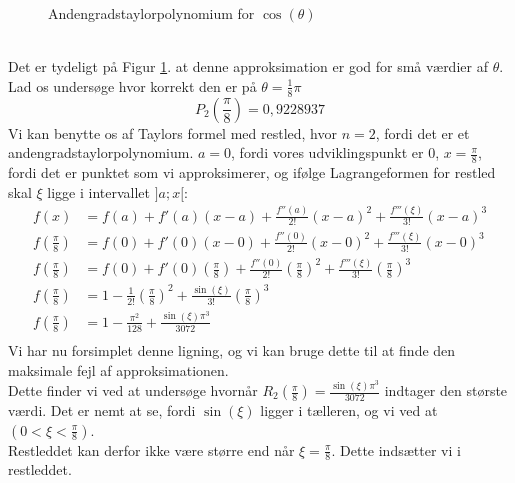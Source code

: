 \documentclass[12pt, a4paper]{article}
\begin{document}
\begin{refsection}
\begin{figure}[h]
     \caption{Andengradstaylorpolynomium for $\cos(\theta)$}
     \label{fig:cosinusanden}
\end{figure}\\
Det er tydeligt på Figur \ref{fig:cosinusanden}. at denne approksimation er god for små værdier af $\theta$. Lad os undersøge hvor korrekt den er på $\theta=\frac{1}{8}\pi$
\begin{equation*}
    P_2\left(\frac{\pi}{8}\right)=0{,}9228937
\end{equation*}
Vi kan benytte os af Taylors formel med restled, hvor $n=2$, fordi det er et andengradstaylorpolynomium.  $a=0$, fordi vores udviklingspunkt er 0,  $x=\frac{\pi}{8}$, fordi det er punktet som vi approksimerer, og ifølge Lagrangeformen for restled skal $\xi$ ligge i intervallet $]a;x[$:
\begin{equation*}
    \begin{aligned}
    f(x)&=f(a)+f'(a)(x-a)+\frac{f''(a)}{2!}(x-a)^2+\frac{f'''(\xi)}{3!}(x-a)^3\\
    f\left(\frac{\pi}{8}\right)&=f(0)+f'(0)(x-0)+\frac{f''(0)}{2!}(x-0)^2+\frac{f'''(\xi)}{3!}(x-0)^3\\
    f\left(\frac{\pi}{8}\right)&=f(0)+f'(0)\left(\frac{\pi}{8}\right)+\frac{f''(0)}{2!}\left(\frac{\pi}{8}\right)^2+\frac{f'''(\xi)}{3!}\left(\frac{\pi}{8}\right)^3\\
    f\left(\frac{\pi}{8}\right)&=1-\frac{1}{2!}\left(\frac{\pi}{8}\right)^2+\frac{\sin(\xi)}{3!}\left(\frac{\pi}{8}\right)^3\\
    f\left(\frac{\pi}{8}\right)&=1-\frac{\pi^2}{128}+\frac{\sin(\xi)\pi^3}{3072}\\
    \end{aligned}
\end{equation*}
Vi har nu forsimplet denne ligning, og vi kan bruge dette til at finde den maksimale fejl af approksimationen.\\
Dette finder vi ved at undersøge hvornår $R_2\left(\frac{\pi}{8}\right)=\frac{\sin(\xi)\pi^3}{3072}$ indtager den største værdi. Det er nemt at se, fordi $\sin(\xi)$ ligger i tælleren, og vi ved at  $(0<\xi<\frac{\pi}{8})$.\\
Restleddet kan derfor ikke være større end når $\xi=\frac{\pi}{8}$. Dette indsætter vi i restleddet.
\begin{equation*}

\end{equation*}
\end{refsection}
\end{document}
